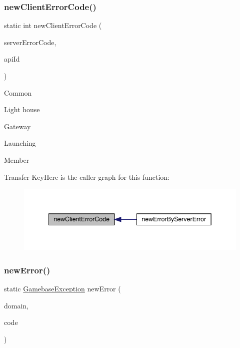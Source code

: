 \subsubsection{\texorpdfstring{new\+Client\+Error\+Code()}{newClientErrorCode()}}
{\footnotesize\ttfamily static int new\+Client\+Error\+Code (\begin{DoxyParamCaption}\item[{int}]{server\+Error\+Code,  }\item[{String}]{api\+Id }\end{DoxyParamCaption})\hspace{0.3cm}{\ttfamily [static]}}

Common

Light house

Gateway

Launching

Member

Transfer KeyHere is the caller graph for this function\+:
\nopagebreak
\begin{figure}[H]
\begin{center}
\leavevmode
\includegraphics[width=342pt]{classcom_1_1toast_1_1android_1_1gamebase_1_1base_1_1_gamebase_error_ae1e31671405d6d3c4660aacf9d9dd3c5_icgraph}
\end{center}
\end{figure}
\mbox{\label{classcom_1_1toast_1_1android_1_1gamebase_1_1base_1_1_gamebase_error_a2d1d7646a1658d188ee9b65a25905661}} 
\subsubsection{\texorpdfstring{new\+Error()}{newError()}\hspace{0.1cm}{\footnotesize\ttfamily [1/2]}}
{\footnotesize\ttfamily static \hyperlink{classcom_1_1toast_1_1android_1_1gamebase_1_1base_1_1_gamebase_exception}{Gamebase\+Exception} new\+Error (\begin{DoxyParamCaption}\item[{@Non\+Null final String}]{domain,  }\item[{final int}]{code }\end{DoxyParamCaption})\hspace{0.3cm}{\ttfamily [static]}}

